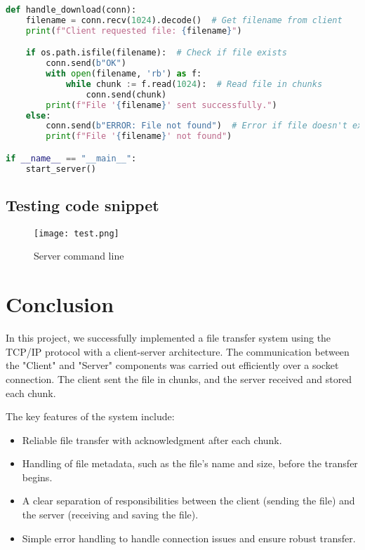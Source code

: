 \documentclass{article}
\begin{document}
\begin{lstlisting}[language=Python, caption=Server code for file transfer using TCP/IP]
def handle_download(conn):
    filename = conn.recv(1024).decode()  # Get filename from client
    print(f"Client requested file: {filename}")

    if os.path.isfile(filename):  # Check if file exists
        conn.send(b"OK")  
        with open(filename, 'rb') as f:
            while chunk := f.read(1024):  # Read file in chunks
                conn.send(chunk)
        print(f"File '{filename}' sent successfully.")
    else:
        conn.send(b"ERROR: File not found")  # Error if file doesn't exist
        print(f"File '{filename}' not found")

if __name__ == "__main__":
    start_server()

\end{lstlisting}

\subsection{Testing code snippet}

\begin{figure}[h]
    \centering
    \texttt{[image: test.png]}
    \caption{Server command line}
    \label{fig:test}
\end{figure}


\thispagestyle{empty}
    \newpage

\section{Conclusion}


In this project, we successfully implemented a file transfer system using the TCP/IP protocol with a client-server architecture. The communication between the "Client" and "Server" components was carried out efficiently over a socket connection. The client sent the file in chunks, and the server received and stored each chunk.

The key features of the system include:
\begin{itemize}
    \item Reliable file transfer with acknowledgment after each chunk.
    \item Handling of file metadata, such as the file's name and size, before the transfer begins.
    \item A clear separation of responsibilities between the client (sending the file) and the server (receiving and saving the file).
    \item Simple error handling to handle connection issues and ensure robust transfer.
\end{itemize}
\end{document}
